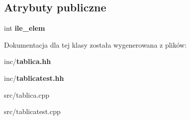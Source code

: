 \subsection*{Atrybuty publiczne}
\begin{DoxyCompactItemize}
\item 
int {\bfseries ile\+\_\+elem}\label{classtablica_a4ef184aeacceb11941ec2595f6699338}

\end{DoxyCompactItemize}


Dokumentacja dla tej klasy została wygenerowana z plików\+:\begin{DoxyCompactItemize}
\item 
inc/{\bf tablica.\+hh}\item 
inc/{\bf tablicatest.\+hh}\item 
src/tablica.\+cpp\item 
src/tablicatest.\+cpp\end{DoxyCompactItemize}
